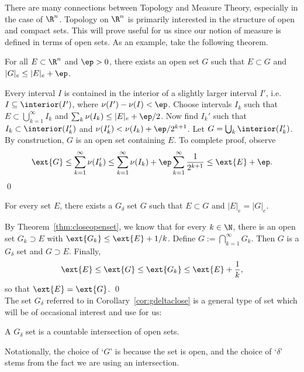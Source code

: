 There are many connections between Topology and Measure Theory, especially in the case of $\R^n$. Topology on $\R^n$ is primarily interested in the structure of open and compact sets. This will prove useful for us since our notion of measure is defined in terms of open sets. As an example, take the following theorem. 


\begin{thm} \label{thm:closeopenset}
For all $E \subset \R^n$ and $\ep>0$, there exists an open set $G$ such that $E \subset G$ and $|G|_e \leq |E|_e + \ep$.
\end{thm}

\pf Every interval $I$ is contained in the interior of a slightly larger interval $I'$, i.e. $I \subseteq \interior(I')$, where $\nu(I')  - \nu(I)<\ep$. Choose intervals $I_k$ such that $E \subset \bigcup_{k=1}^\infty I_k$ and $\sum_k \nu(I_k) \leq |E|_e + \ep/2$. Now find $I_k'$ such that $I_k \subset \interior(I_k')$ and $\nu(I_k') < \nu(I_k) + \ep/2^{k+1}$. Let $G= \bigcup_k \interior(I_k')$. By construction, $G$ is an open set containing $E$. To complete proof, observe
	\[
	\ext{G} \leq \sum_{k=1}^\infty \nu(I_k') \leq \sum_{k=1}^\infty \nu(I_k) + \ep \sum_{k=1}^\infty \dfrac{1}{2^{k+1}} \leq \ext{E} + \ep.
	\] \qed \\


\begin{cor} \label{cor:gdeltaclose}
For every set $E$, there exists a $G_\delta$ set $G$ such that $E \subset G$ and $|E|_e=|G|_e$.
\end{cor}

\pf By Theorem~\ref{thm:closeopenset}, we know that for every $k \in \N$, there is an open set $G_k \supset E$ with $\ext{G_k} \leq \ext{E}+ 1/k$. Define $G:= \bigcap_{k=1}^\infty G_k$. Then $G$ is a $G_\delta$ set and $G \supset E$. Finally, 
	\[
	\ext{E} \leq \ext{G} \leq \ext{G_k} \leq \ext{E} + \dfrac{1}{k},
	\]
so that $\ext{E}= \ext{G}$. \qed \\


\noindent The set $G_\delta$ referred to in Corollary~\ref{cor:gdeltaclose} is a general type of set which will be of occasional interest and use for us:


\begin{dfn}
A $G_\delta$ set is a countable intersection of open sets. 
\end{dfn}


\noindent Notationally, the choice of `$G$' is because the set is open, and the choice of `$\delta$' stems from the fact we are using an intersection.


